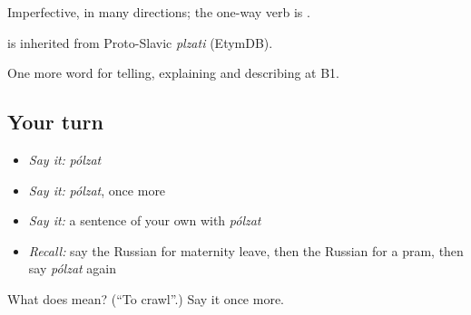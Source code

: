 Imperfective, in many directions; the one-way verb is \emph{}.

\begin{cousinweb}
\emph{} is inherited from Proto-Slavic \emph{plzati} (EtymDB).
\end{cousinweb}

\begin{grammarlens}[title={What you've built}]
One more word for telling, explaining and describing at B1.
\end{grammarlens}

\subsection*{Your turn}
\begin{itemize}
\raggedright
  \item \emph{Say it:} \emph{pólzat}
  \item \emph{Say it:} \emph{pólzat}, once more
  \item \emph{Say it:} a sentence of your own with \emph{pólzat}
  \item \emph{Recall:} say the Russian for maternity leave, then the Russian for a pram, then say \emph{pólzat} again
\end{itemize}

\begin{tcolorbox}[breakable,colback=teal!4,colframe=teal!35!black,title={Before you move on}]
What does  mean? (\textquotedblleft{}To crawl\textquotedblright{}.) Say it once more.
\end{tcolorbox}
